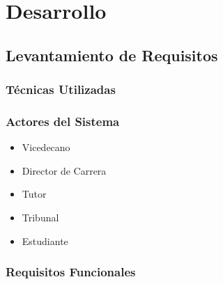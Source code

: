 \section{Desarrollo}
\label{sec:desarrollo}

\subsection{Levantamiento de Requisitos}

\subsubsection{Técnicas Utilizadas}


\subsubsection{Actores del Sistema}

\begin{itemize}
    \item Vicedecano
    \item Director de Carrera
    \item Tutor
    \item Tribunal
    \item Estudiante
\end{itemize}

\subsubsection{Requisitos Funcionales}

